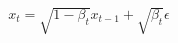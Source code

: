 \documentclass[preview]{standalone}
\begin{document}
\begin{align*}
x_t = \sqrt{1-\beta_t}x_{t-1} + \sqrt{\beta_t}\epsilon
\end{align*}
\end{document}
